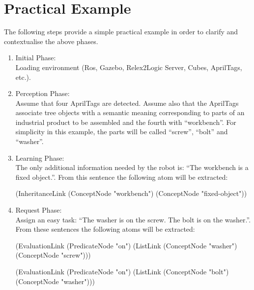 \section{Practical Example}\label{sec:alg_example}

The following steps provide a simple practical example in order to clarify and contextualise the above phases.

\begin{enumerate}

	\item Initial Phase: \\
Loading environment (Ros, Gazebo, Relex2Logic Server, Cubes, AprilTags, etc.).

	\item Perception Phase: \\
Assume that four AprilTags are detected. Assume also that the AprilTags associate tree objects with a semantic meaning corresponding to parts of an industrial product to be assembled and the fourth with \enquote{workbench}. For simplicity in this example, the parts will be called \enquote{screw}, \enquote{bolt} and \enquote{washer}.

	\item Learning Phase: \\
The only additional information needed by the robot is: \enquote{The workbench is a fixed object.}. From this sentence the following atom will be extracted:
\begin{python}
	(InheritanceLink
		(ConceptNode "workbench")
		(ConceptNode "fixed-object"))
\end{python}

	\item Request Phase: \\
Assign an easy task: \enquote{The washer is on the screw. The bolt is on the washer.}.  From these sentences the following atoms will be extracted:
\begin{python}
	(EvaluationLink
		(PredicateNode "on")
		(ListLink
			(ConceptNode "washer")
			(ConceptNode "screw")))

	(EvaluationLink
		(PredicateNode "on")
		(ListLink
			(ConceptNode "bolt")
			(ConceptNode "washer")))
\end{python}


\end{enumerate}
